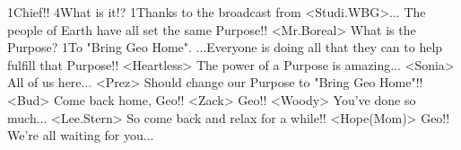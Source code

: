 1Chief!! 
4What is it!? 
1Thanks to the broadcast from <Studi.WBG>... 
The people of Earth have all set the same Purpose!! 
<Mr.Boreal> What is the Purpose? 
1To "Bring Geo Home". 
...Everyone is doing all that they can to help fulfill that Purpose!! 
<Heartless> The power of a Purpose is amazing... 
<Sonia> All of us here... 
<Prez> Should change our Purpose to "Bring Geo Home"!! 
<Bud> Come back home, Geo!! 
<Zack> Geo!! 
<Woody> You've done so much... 
<Lee.Stern> So come back and relax for a while!! 
<Hope(Mom)> Geo!! We're all waiting for you... 
